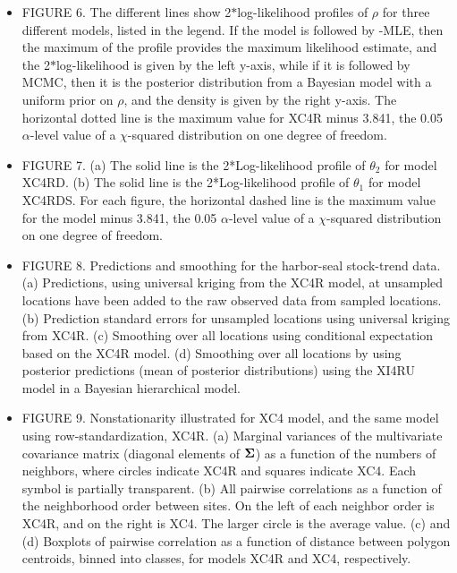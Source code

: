 \documentclass[11pt, titlepage]{article}\usepackage[]{graphicx}\usepackage[]{color}
\begin{document}
\begin{spacing}{1.9}
\begin{flushleft}
\begin{itemize}
  \item FIGURE 6. The different lines show 2$*$log-likelihood profiles of $\rho$ for three different models, listed in the legend.  If the model is followed by -MLE, then the maximum of the profile provides the maximum likelihood estimate, and the 2$*$log-likelihood is given by the left y-axis, while if it is followed by MCMC, then it is the posterior distribution from a Bayesian model with a uniform prior on $\rho$, and the density is given by the right y-axis.  The horizontal dotted line is the maximum value for XC4R minus 3.841, the 0.05 $\alpha$-level value of a $\chi$-squared distribution on one degree of freedom.

  \item FIGURE 7. (a) The solid line is the 2*Log-likelihood profile of $\theta_2$ for model XC4RD. (b) The solid line is the 2*Log-likelihood profile of $\theta_1$ for model XC4RDS.  For each figure, the horizontal dashed line is the maximum value for the model minus 3.841, the 0.05 $\alpha$-level value of a $\chi$-squared distribution on one degree of freedom.

  \item FIGURE 8. Predictions and smoothing for the harbor-seal stock-trend data. (a) Predictions, using universal kriging from the XC4R model, at unsampled locations have been added to the raw observed data from sampled locations. (b) Prediction standard errors for unsampled locations using universal kriging from XC4R. (c) Smoothing over all locations using conditional expectation based on the XC4R model.  (d) Smoothing over all locations by using posterior predictions (mean of posterior distributions) using the XI4RU model in a Bayesian hierarchical model. 

  \item FIGURE 9. Nonstationarity illustrated for XC4 model, and the same model using row-standardization, XC4R.  (a) Marginal variances of the multivariate covariance matrix (diagonal elements of $\mbox{\boldmath $\Sigma$}$) as a function of the numbers of neighbors, where circles indicate XC4R and squares indicate XC4.  Each symbol is partially transparent. (b) All pairwise correlations as a function of the neighborhood order between sites. On the left of each neighbor order is XC4R, and on the right is XC4.  The larger circle is the average value. (c) and (d) Boxplots of pairwise correlation as a function of distance between polygon centroids, binned into classes, for models XC4R and XC4, respectively.

\end{itemize}


\end{flushleft}
\end{spacing}
\end{document}
